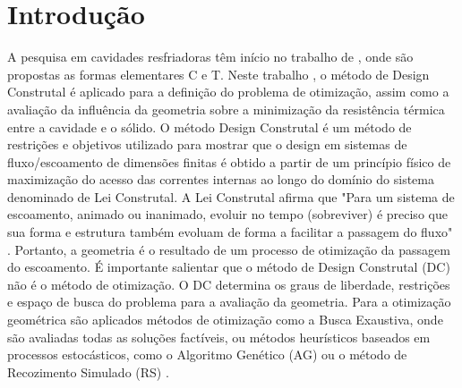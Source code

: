 \documentclass[12pt,A4,A4pt]{article}
\begin{document}
\newpage
 \onehalfspacing
\section{Introdução}

 {\fontsize{12pt}{\baselineskip}\selectfont}
 
\hspace{0.5cm}A pesquisa em cavidades resfriadoras têm início no trabalho de , onde são propostas as formas elementares C e T. Neste trabalho \cite{Biserni2004}, o método de Design Construtal é aplicado para a definição do problema de otimização, assim como a avaliação da influência da geometria sobre a minimização da resistência térmica entre a cavidade e o sólido. O método Design Construtal é um método de restrições e objetivos utilizado para mostrar que o design em sistemas de fluxo/escoamento de dimensões finitas é obtido a partir de um princípio físico de maximização do acesso das correntes internas ao longo do domínio do sistema denominado de Lei Construtal. A Lei Construtal afirma que "Para um sistema de escoamento, animado ou inanimado, evoluir no tempo (sobreviver) é preciso que sua forma e estrutura também evoluam de forma a facilitar a passagem do fluxo"        \cite{Bejan}. Portanto, a geometria é o resultado de um processo de otimização da passagem do escoamento. É importante salientar que o método de Design Construtal (DC) não é o método de otimização. O DC determina os graus de liberdade, restrições e espaço de busca do problema para a avaliação da geometria. Para a otimização geométrica são aplicados métodos de otimização como a Busca Exaustiva, onde são avaliadas todas as soluções factíveis, ou métodos heurísticos baseados em processos estocásticos, como o Algoritmo Genético (AG) ou o método de Recozimento Simulado (RS) \cite{Lorenzini2014,Gonzales2015energy}.
\end{document}
